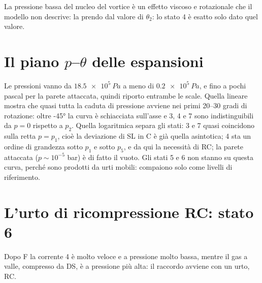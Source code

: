 La pressione bassa del nucleo del vortice è un effetto viscoso e rotazionale che il modello non descrive: la prendo
dal valore di $\theta_2$: lo stato 4 è esatto solo dato quel valore.

\section*{Il piano $p$--$\theta$ delle espansioni}
Le pressioni vanno da $\SI{18.5e5}{Pa}$ a meno di $\SI{0.2e5}{Pa}$, e fino a pochi pascal per la parete attaccata,
quindi riporto entrambe le scale. Quella lineare mostra che quasi tutta la caduta di pressione avviene nei primi
20--30 gradi di rotazione: oltre \ang{-45} la curva è schiacciata sull'asse e 3, 4 e 7 sono indistinguibili da $p=0$
rispetto a $p_2$. Quella logaritmica separa gli stati: 3 e 7 quasi coincidono sulla retta $p=p_1$, cioè la deviazione
di SL in C è già quella asintotica; 4 sta un ordine di grandezza sotto $p_1$ e sotto $p_5$, e da qui la necessità di
RC; la parete attaccata ($p\sim10^{-5}$ bar) è di fatto il vuoto. Gli stati 5 e 6 non stanno su questa curva, perché
sono prodotti da urti mobili: compaiono solo come livelli di riferimento.

\section*{L'urto di ricompressione RC: stato 6}
Dopo F la corrente 4 è molto veloce e a pressione molto bassa, mentre il gas a valle, compresso da DS, è a pressione
più alta: il raccordo avviene con un urto, RC.

